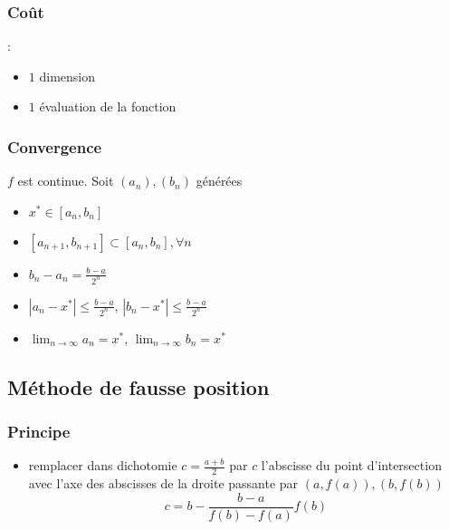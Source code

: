 \subsubsection*{Coût}:
\begin{itemize}
    \item $1$ dimension
    \item  $1$ évaluation de la fonction
\end{itemize}
\subsubsection*{Convergence}
$f$ est continue. Soit  $(a_n), (b_n)$ générées
 \begin{itemize}
     \item $x^* \in [a_n, b_n]$
     \item $[a_{n+1}, b_{n+1}] \subset [a_n, b_n], \forall n$
     \item $b_n - a_n = \frac{b - a}{2^n}$ 
     \item $|a_n - x^*| \le \frac{b - a}{2^n}$, $|b_n - x^*| \le \frac{b - a}{2^n}$ 
     \item $\lim_{n \to \infty} a_n = x^*$, $\lim_{n \to \infty} b_n = x^*$
\end{itemize}

\subsection{Méthode de fausse position}
\subsubsection*{Principe}
\begin{itemize}
    \item remplacer dans dichotomie $c = \frac{a + b}{2}$ par $c$ l'abscisse du point d'intersection avec l'axe des abscisses de la droite passante par  $(a, f(a)), (b, f(b))$
         \[
        c = b - \frac{b - a}{f(b) - f(a)}f(b)
        \] 
\end{itemize}
